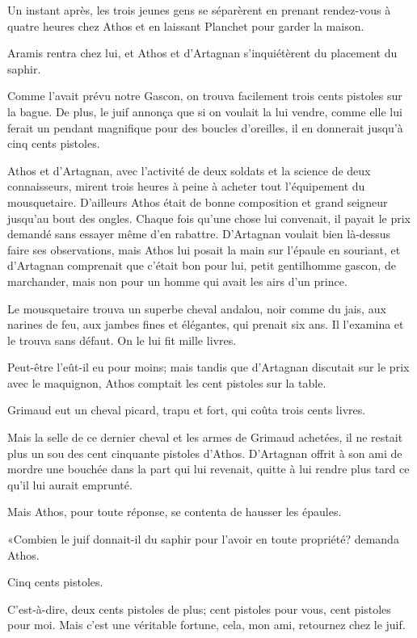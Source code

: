 Un instant après, les trois jeunes gens se séparèrent en prenant rendez-vous à quatre heures chez Athos et en laissant Planchet pour garder la maison. 

Aramis rentra chez lui, et Athos et d'Artagnan s'inquiétèrent du placement du saphir. 

Comme l'avait prévu notre Gascon, on trouva facilement trois cents pistoles sur la bague. De plus, le juif annonça que si on voulait la lui vendre, comme elle lui ferait un pendant magnifique pour des boucles d'oreilles, il en donnerait jusqu'à cinq cents pistoles. 

Athos et d'Artagnan, avec l'activité de deux soldats et la science de deux connaisseurs, mirent trois heures à peine à acheter tout l'équipement du mousquetaire. D'ailleurs Athos était de bonne composition et grand seigneur jusqu'au bout des ongles. Chaque fois qu'une chose lui convenait, il payait le prix demandé sans essayer même d'en rabattre. D'Artagnan voulait bien là-dessus faire ses observations, mais Athos lui posait la main sur l'épaule en souriant, et d'Artagnan comprenait que c'était bon pour lui, petit gentilhomme gascon, de marchander, mais non pour un homme qui avait les airs d'un prince. 

Le mousquetaire trouva un superbe cheval andalou, noir comme du jais, aux narines de feu, aux jambes fines et élégantes, qui prenait six ans. Il l'examina et le trouva sans défaut. On le lui fit mille livres. 

Peut-être l'eût-il eu pour moins; mais tandis que d'Artagnan discutait sur le prix avec le maquignon, Athos comptait les cent pistoles sur la table. 

Grimaud eut un cheval picard, trapu et fort, qui coûta trois cents livres. 

Mais la selle de ce dernier cheval et les armes de Grimaud achetées, il ne restait plus un sou des cent cinquante pistoles d'Athos. D'Artagnan offrit à son ami de mordre une bouchée dans la part qui lui revenait, quitte à lui rendre plus tard ce qu'il lui aurait emprunté. 

Mais Athos, pour toute réponse, se contenta de hausser les épaules. 

«Combien le juif donnait-il du saphir pour l'avoir en toute propriété? demanda Athos. 

\speak  Cinq cents pistoles. 

\speak  C'est-à-dire, deux cents pistoles de plus; cent pistoles pour vous, cent pistoles pour moi. Mais c'est une véritable fortune, cela, mon ami, retournez chez le juif. 

